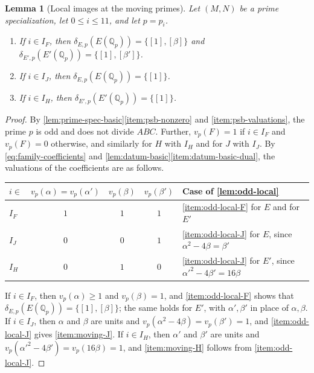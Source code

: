\documentclass[12pt,oneside,openany]{book}
\theoremstyle{definition}
\theoremstyle{plain}
\numberwithin{equation}{chapter}
\theoremstyle{plain}
\newtheorem{lemma}[lemma]{Lemma}
\theoremstyle{definition}
\theoremstyle{remark}
\newcommand{\Q}{\mathbb Q}
\newcommand{\sq}[1]{[#1]}
\begin{document}
\begin{lemma}[Local images at the moving primes]\label{lem:moving-images}
Let $(M,N)$ be a prime specialization, let $0\le i\le11$, and let $p=p_i$.
\begin{enumerate}[label=(\alph*),ref=(\alph*)]
\item\label{item:moving-F} If $i\in I_F$, then $\delta_{E,p}(E(\Q_p))=\{\sq1,\sq\beta\}$ and $\delta_{E',p}(E'(\Q_p))=\{\sq1,\sq{\beta'}\}$.
\item\label{item:moving-J} If $i\in I_J$, then $\delta_{E,p}(E(\Q_p))=\{\sq1\}$.
\item\label{item:moving-H} If $i\in I_H$, then $\delta_{E',p}(E'(\Q_p))=\{\sq1\}$.
\end{enumerate}
\end{lemma}

\begin{proof}
By \cref{lem:prime-spec-basic}\ref{item:psb-nonzero} and \ref{item:psb-valuations}, the prime $p$ is odd and does not divide $ABC$. Further, $v_p(F)=1$ if $i\in I_F$ and $v_p(F)=0$ otherwise, and similarly for $H$ with $I_H$ and for $J$ with $I_J$. By \eqref{eq:family-coefficients} and \cref{lem:datum-basic}\ref{item:datum-basic-dual}, the valuations of the coefficients are as follows.
\begin{center}
\begin{tabular}{lcccl}
\toprule
$i\in$ & $v_p(\alpha)=v_p(\alpha')$ & $v_p(\beta)$ & $v_p(\beta')$ & Case of \cref{lem:odd-local}\\
\midrule
$I_F$ & $1$ & $1$ & $1$ & \ref{item:odd-local-F} for $E$ and for $E'$\\
$I_J$ & $0$ & $0$ & $1$ & \ref{item:odd-local-J} for $E$, since $\alpha^2-4\beta=\beta'$\\
$I_H$ & $0$ & $1$ & $0$ & \ref{item:odd-local-J} for $E'$, since $\alpha'^2-4\beta'=16\beta$\\
\bottomrule
\end{tabular}
\end{center}
If $i\in I_F$, then $v_p(\alpha)\ge1$ and $v_p(\beta)=1$, and \cref{item:odd-local-F} shows that $\delta_{E,p}(E(\Q_p))=\{\sq1,\sq\beta\}$; the same holds for $E'$, with $\alpha',\beta'$ in place of $\alpha,\beta$. If $i\in I_J$, then $\alpha$ and $\beta$ are units and $v_p(\alpha^2-4\beta)=v_p(\beta')=1$, and \cref{item:odd-local-J} gives \ref{item:moving-J}. If $i\in I_H$, then $\alpha'$ and $\beta'$ are units and $v_p(\alpha'^2-4\beta')=v_p(16\beta)=1$, and \ref{item:moving-H} follows from \cref{item:odd-local-J}.
\end{proof}
\end{document}
